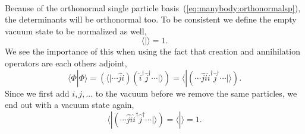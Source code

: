 \paragraph*{}
Because of the orthonormal single particle basis~(\ref{eq:manybody:orthonormalsp}), the determinants will be orthonormal too.
To be consistent we define the empty vacuum state to be normalized as well,
\begin{equation}
\langle | \rangle = 1 .
\end{equation}
We see the importance of this when using the fact that creation and annihilation operators are each others adjoint,
\begin{equation}
\langle \Phi | \Phi \rangle = 
\left( \langle | \cdots \hat{j} \hat{i} \right) \left( \hat{i}^{\dagger} \hat{j}^{\dagger} \cdots | \rangle \right) =
 \langle | \left(  \cdots \hat{j} \hat{i}\hat{i}^{\dagger} \hat{j}^{\dagger} \cdots | \rangle \right)  .
\end{equation}
Since we first add $i,j,...$ to the vacuum before we remove the same particles, we end out with a vacuum state again,
\begin{equation}
 \langle | \left(  \cdots \hat{j} \hat{i}\hat{i}^{\dagger} \hat{j}^{\dagger} \cdots | \rangle \right) = 
 \langle | \rangle = 1 .
\end{equation}

